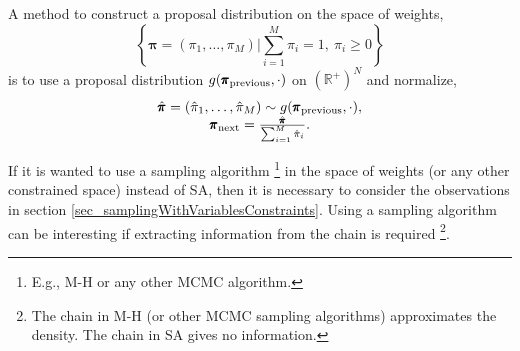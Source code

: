 \begin{remark}
A method to construct a proposal distribution on the space of weights, 
\begin{equation} \label{eq_mixtureWeightsSpace}
  \left\{ \pmb{\pi} = (\pi_1,\dots,\pi_M) \Bigg\vert \sum_{i=1}^M \pi_i=1, \ \pi_i \geq 0 \right\}
\end{equation}
is to use a proposal distribution $g(\pmb{\pi}_{\textup{previous}},\cdot)$ on $(\mathbb{R}^+)^N$ and normalize,
$$
 \begin{array}{c} 
  \hat{\pmb{\pi}} = (\hat{\pi}_1,\dots,\hat{\pi}_M) \sim g(\pmb{\pi}_{\textup{previous}},\cdot), \\ 
  \pmb{\pi}_{\textup{next}} = \frac{\hat{\pmb{\pi}}}{\sum_{i=1}^M \hat{\pi}_i}.
 \end{array}
$$
\end{remark}

\begin{remark}
  If it is wanted to use a sampling algorithm
\footnote{E.g., M-H or any other MCMC algorithm.} in the space of weights (or any other constrained space) instead of SA, then it is necessary to consider the observations in section \ref{sec_samplingWithVariablesConstraints}. Using a sampling algorithm can be interesting if extracting information from the chain is required
\footnote{The chain in M-H (or other MCMC sampling algorithms) approximates the density. The chain in SA gives no information.}.
\end{remark}

